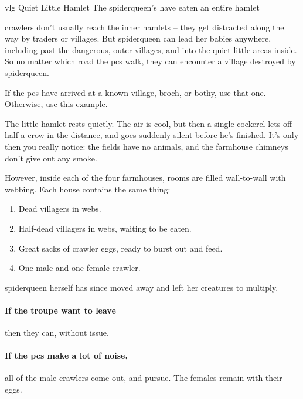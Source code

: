 {\gls{vlg} Quiet Little Hamlet}%
{The \gls{spiderqueen}'s  have eaten an entire hamlet}%

\Glspl{crawler} don't usually reach the inner hamlets -- they get distracted along the way by traders or \glspl{village}.
But \gls{spiderqueen} can lead her babies anywhere, including past the dangerous, outer \glspl{village}, and into the quiet little areas inside.
So no matter which road the \glspl{pc} walk, they can encounter a village destroyed by \gls{spiderqueen}.

If the \glspl{pc} have arrived at a known \gls{village}, \gls{broch}, or \gls{bothy}, use that one.
Otherwise, use this example.

\begin{boxtext}
  The little hamlet rests quietly.
  The air is cool, but then a single cockerel lets off half a crow in the distance, and goes suddenly silent before he's finished.
  It's only then you really notice: the fields have no animals, and the farmhouse chimneys don't give out any smoke.
\end{boxtext}

However, inside each of the four farmhouses, rooms are filled wall-to-wall with webbing.  Each house contains the same thing:

\begin{enumerate}
  \item
  Dead villagers in webs.
  \item
  Half-dead villagers in webs, waiting to be eaten.
  \item
  Great sacks of \gls{crawler} eggs, ready to burst out and feed.
  \item
    One male and one female \gls{crawler}.
\end{enumerate}



\Gls{spiderqueen} herself has since moved away and left her creatures to multiply.

\paragraph{If the troupe want to leave}
then they can, without issue.

\paragraph{If the \glspl{pc} make a lot of noise,}
all of the male \glspl{crawler} come out, and pursue.
The females remain with their eggs.

